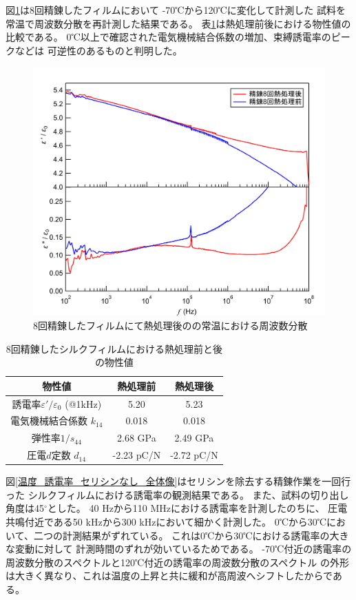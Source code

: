 \documentclass[dvipdfmx,12pt,a4paper]{jreport}
\begin{document}
			図\ref{熱処理後の誘電率}は8回精錬したフィルムにおいて
			-70℃から120℃に変化して計測した
			試料を常温で周波数分散を再計測した結果である。
			表\ref{8回_熱処理前後_物性値}は熱処理前後における物性値の比較である。
			0℃以上で確認された電気機械結合係数の増加、束縛誘電率のピークなどは
			可逆性のあるものと判明した。
			\begin{figure}[H]
				\centering
				\includegraphics[scale=0.6]{8回精錬_熱処理前と後.jpg}
				\caption{8回精錬したフィルムにて熱処理後のの常温における周波数分散}
				\label{熱処理後の誘電率}
			\end{figure}
			\newpage
			\begin{table}[h]
				\centering
				\caption{8回精錬したシルクフィルムにおける熱処理前と後の物性値}
				\label{8回_熱処理前後_物性値}
				\begin{tabular}{c c c} \hline
					物性値 & 熱処理前 & 熱処理後  \\ \hline \hline
					誘電率$\varepsilon'/\varepsilon_0$ (@1kHz) & 5.20 & 5.23 \\
					電気機械結合係数 $k_{14}$ & 0.018 & 0.018 \\
					弾性率$1/s_{44}$ &  2.68 GPa & 2.49 GPa \\
					圧電$d$定数 $d_{14}$ & -2.23 pC/N & -2.72 pC/N \\ \hline
				\end{tabular}
			\end{table}
			\newpage
			図\ref{温度_誘電率_セリシンなし_全体像}はセリシンを除去する精錬作業を一回行った
			シルクフィルムにおける誘電率の観測結果である。
			また、試料の切り出し角度は45$^{\circ}$とした。
			40 Hzから110 MHzにおける誘電率を計測したのちに、
			圧電共鳴付近である50 kHzから300 kHzにおいて細かく計測した。
			0℃から30℃において、二つの計測結果がずれている。
			これは0℃から30℃における誘電率の大きな変動に対して
			計測時間のずれが効いているためである。
			-70℃付近の誘電率の周波数分散のスペクトルと120℃付近の誘電率の周波数分散のスペクトル
			の外形は大きく異なり、これは温度の上昇と共に緩和が高周波へシフトしたからである。
\end{document}
